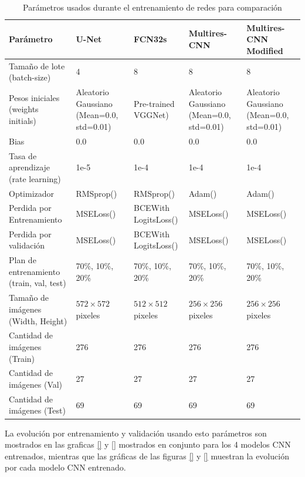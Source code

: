 \documentclass[10pt,letterpaper]{article}
\begin{document}
\begin{table}[H]
\begin{center}
\begin{tabular}{ p{2.5cm}  p{1.5cm}  p{1.5cm}  p{1.7cm}  p{2.3cm} }
\hline
Parámetro & U-Net & FCN32s & Multires-CNN & Multires-CNN Modified\\	
\hline
Tamaño de lote (batch-size) & 4    & 8 & 8 & 8 \\
\hline
Pesos iniciales (weights initials) & Aleatorio Gaussiano (Mean=0.0, std=0.01)  
								   & Pre-trained VGGNet) 
								   & Aleatorio Gaussiano (Mean=0.0, std=0.01) 
								   & Aleatorio Gaussiano (Mean=0.0, std=0.01) \\
\hline
Bias                       & 0.0  & 0.0 & 0.0 & 0.0 \\
\hline
Tasa de aprendizaje (rate learning) & 1e-5  & 1e-4 & 1e-4 & 1e-4 \\
\hline
Optimizador                & RMSprop()   & RMSprop() & Adam() & Adam() \\
\hline
Perdida por Entrenamiento         & MSELoss() & BCEWith
LogitsLoss() & MSELoss() & MSELoss() \\
\hline
Perdida por validación         & MSELoss() & BCEWith
LogitsLoss() & MSELoss() & MSELoss() \\
\hline
Plan de entrenamiento (train, val, test)& 70\%, 10\%, 20\%  & 70\%, 10\%, 20\% & 70\%, 10\%, 20\% & 70\%, 10\%, 20\% \\
\hline
Tamaño de imágenes (Width, Height)        & $572\times572$  pixeles & $512\times512$ pixeles & $256\times256$ pixeles & $256\times256$ pixeles \\
\hline
Cantidad de imágenes (Train) & 276  & 276 & 276 & 276 \\
\hline
Cantidad de imágenes (Val)   & 27  & 27 & 27 & 27 \\
\hline
Cantidad de imágenes (Test)  & 69  & 69 & 69 & 69 \\
\hline
\end{tabular}
\caption{Parámetros usados durante el entrenamiento de redes para comparación}
\label{Parametroscomparacion}
\end{center}
\end{table}

La evolución por entrenamiento y validación usando esto parámetros son mostrados en las graficas \ref{} y \ref{} mostrados en conjunto para los 4 modelos CNN entrenados, mientras que las gráficas de las figuras \ref{} y \ref{} muestran la evolución por cada modelo CNN entrenado.
\end{document}
